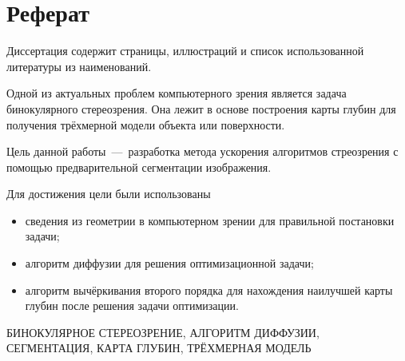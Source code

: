 \chapter*{Реферат}

Диссертация содержит \pageref{LastPage} страницы,
 иллюстраций и список использованной литературы из
 наименований.

Одной из актуальных проблем компьютерного зрения является задача бинокулярного стереозрения.
Она лежит в основе построения карты глубин для получения трёхмерной
модели объекта или поверхности.

Цель данной работы~---~разработка метода ускорения
алгоритмов стреозрения с помощью
предварительной сегментации изображения.

Для достижения цели были использованы
\begin{itemize}
  \item сведения из геометрии в компьютерном зрении для правильной постановки задачи;
  \item алгоритм диффузии для решения оптимизационной задачи;
  \item алгоритм вычёркивания второго порядка для нахождения наилучшей
  карты глубин после решения задачи оптимизации.
\end{itemize}

\MakeUppercase{бинокулярное стереозрение,
               алгоритм диффузии,
               сегментация,
               карта глубин,
               трёхмерная модель}
